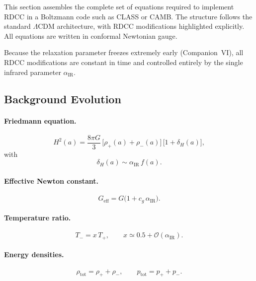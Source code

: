 \documentclass[11pt,a4paper]{article}
\begin{document}
This section assembles the complete set of equations required to implement RDCC in a
Boltzmann code such as CLASS or CAMB. The structure follows the standard
$\Lambda$CDM architecture, with RDCC modifications highlighted explicitly. All equations
are written in conformal Newtonian gauge.

Because the relaxation parameter freezes extremely early (Companion~VI), all RDCC
modifications are constant in time and controlled entirely by the single infrared parameter
$\alpha_{\mathrm{IR}}$.

\subsection{Background Evolution}

\paragraph{Friedmann equation.}
\begin{equation}
    H^{2}(a)
    = \frac{8\pi G}{3}\,\bigl[\rho_{+}(a) + \rho_{-}(a)\bigr]\,
      \bigl[1 + \delta_{H}(a)\bigr],
\end{equation}
with
\begin{equation}
    \delta_{H}(a) \sim \alpha_{\mathrm{IR}}\,f(a).
\end{equation}

\paragraph{Effective Newton constant.}
\begin{equation}
    G_{\mathrm{eff}} = G\bigl(1 + c_{g}\,\alpha_{\mathrm{IR}}\bigr).
\end{equation}

\paragraph{Temperature ratio.}
\begin{equation}
    T_{-} = x\,T_{+}, \qquad x \simeq 0.5 + \mathcal{O}(\alpha_{\mathrm{IR}}).
\end{equation}

\paragraph{Energy densities.}
\begin{equation}
    \rho_{\mathrm{tot}} = \rho_{+} + \rho_{-}, \qquad
    p_{\mathrm{tot}} = p_{+} + p_{-}.
\end{equation}
\end{document}
